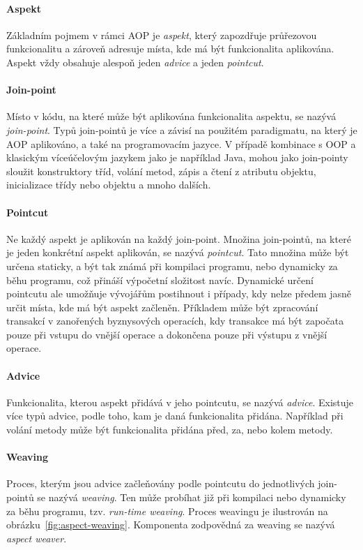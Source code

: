 \paragraph{Aspekt}
Základním pojmem v rámci \gls{AOP} je \textit{aspekt},
který zapozdřuje průřezovou funkcionalitu a zároveň adresuje místa, kde má být
funkcionalita aplikována. Aspekt vždy obsahuje alespoň jeden \textit{advice}
a jeden \textit{pointcut}.

\paragraph{Join-point}
Místo v kódu, na které může být aplikována funkcionalita aspektu, se nazývá
\textit{join-point}. Typů join-pointů je více a závisí na použitém paradigmatu,
na který je \gls{AOP} aplikováno, a také na programovacím jazyce. V případě
kombinace s \gls{OOP} a klasickým víceúčelovým jazykem jako je například Java,
mohou jako join-pointy sloužit konstruktory tříd, volání metod, zápis a čtení
z atributu objektu, inicializace třídy nebo objektu a mnoho dalších.

\paragraph{Pointcut}
Ne každý aspekt je aplikován na každý join-point. Množina join-pointů,
na které je jeden konkrétní aspekt aplikován, se nazývá \textit{pointcut}.
Tato množina může být určena staticky, a být tak známá při kompilaci programu, nebo
dynamicky za běhu programu, což přináší výpočetní složitost navíc.
Dynamické určení pointcutu ale umožňuje vývojářům postihnout i případy,
kdy nelze předem jasně určit místa, kde má být aspekt začleněn.
Příkladem může být zpracování transakcí v zanořených byznysových operacích,
kdy transakce má být započata pouze při vstupu do vnější operace
a dokončena pouze při výstupu z vnější operace.

\paragraph{Advice}
Funkcionalita, kterou aspekt přidává v jeho pointcutu, se nazývá
\textit{advice}. Existuje více typů advice, podle toho, kam je
daná funkcionalita přidána. Například při volání metody může
být funkcionalita přidána před, za, nebo kolem metody.

\paragraph{Weaving}
Proces, kterým jsou advice začleňovány podle pointcutu do
jednotlivých join-pointů se nazývá \textit{weaving}. Ten může
probíhat již při kompilaci nebo dynamicky za běhu programu,
tzv. \textit{run-time weaving}. Proces weavingu je ilustrován
na obrázku~\ref{fig:aspect-weaving}. Komponenta zodpovědná za
weaving se nazývá \textit{aspect weaver}.

